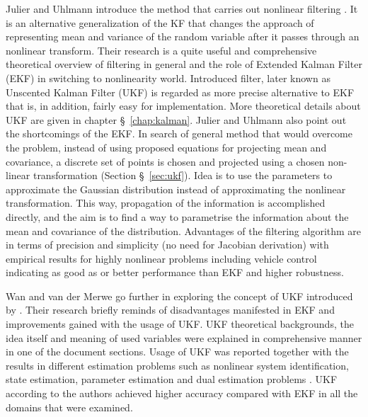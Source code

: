 Julier and Uhlmann introduce the method that carries out nonlinear filtering \cite{julier96}. It is an alternative generalization of the KF that changes the approach of representing mean and variance of the random variable after it passes through an nonlinear transform. Their research is a quite useful and comprehensive theoretical overview of filtering in general and the role of Extended Kalman Filter (EKF) in switching to nonlinearity world. Introduced filter, later known as Unscented Kalman Filter (UKF) is regarded as more precise alternative to EKF that is, in addition, fairly easy for implementation. More theoretical details about UKF are given in chapter \S~\ref{chap:kalman}. Julier and Uhlmann also point out the shortcomings of the EKF. In search of general method that would overcome the problem, instead of using proposed equations for projecting mean and covariance, a discrete set of points is chosen and projected using a chosen non-linear transformation (Section \S~\ref{sec:ukf}). Idea is to use the parameters to approximate the Gaussian distribution instead of approximating the nonlinear transformation. This way, propagation of the information is accomplished directly, and the aim is to find a way to parametrise the information about the mean and covariance of the distribution. Advantages of the filtering algorithm are in terms of precision and simplicity (no need for Jacobian derivation) with empirical results for highly nonlinear problems including vehicle control indicating as good as or better performance than EKF and higher robustness.

Wan and van der Merwe \cite{wan00} go further in exploring the concept of UKF introduced by \cite{julier96}. Their research briefly reminds of disadvantages manifested in EKF and improvements gained with the usage of UKF. UKF theoretical backgrounds, the idea itself and meaning of used variables were explained in comprehensive manner in one of the document sections. Usage of UKF was reported together with the results in different estimation problems such as nonlinear system identification, state estimation, parameter estimation and dual estimation problems \cite{wan00}. UKF according to the authors achieved higher accuracy compared with EKF in all the domains that were examined.
